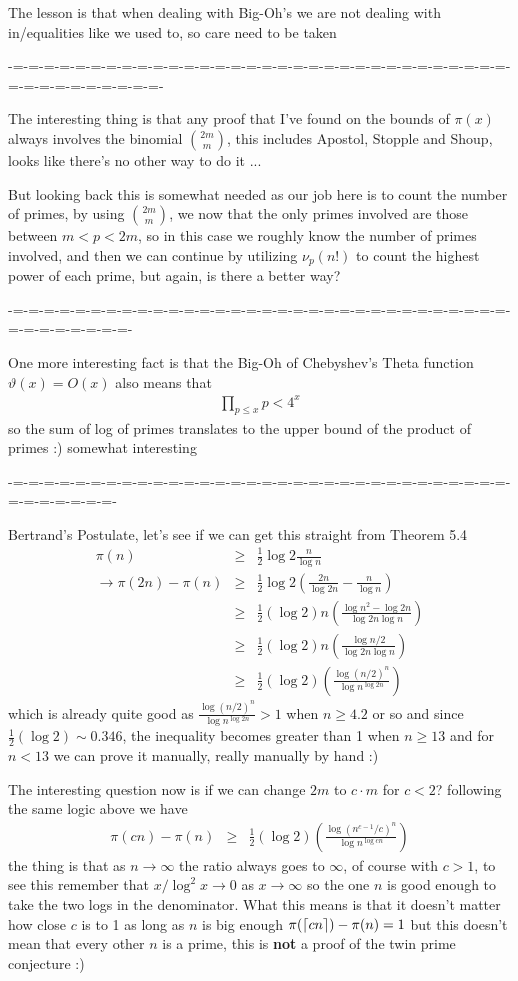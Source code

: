 \documentclass[aps,preprint,preprintnumbers,nofootinbib,showpacs,prd]{revtex4-1}
\newcommand{\nbea}{\begin{eqnarray*}}
\newcommand{\neea}{\end{eqnarray*}}
\DeclarePairedDelimiter{\ceil}{\lceil}{\rceil}
\begin{document}
The lesson is that when dealing with Big-Oh's we are not dealing with in/equalities like we used to, so care need to be taken

-=-=-=-=-=-=-=-=-=-=-=-=-=-=-=-=-=-=-=-=-=-=-=-=-=-=-=-=-=-=-=-=-=-=-=-=-=-=-=-=-=-=-

The interesting thing is that any proof that I've found on the bounds of $\pi(x)$ always involves the binomial $\binom{2m}{ m}$, this includes Apostol, Stopple and Shoup, looks like there's no other way to do it ...

But looking back this is somewhat needed as our job here is to count the number of primes, by using $\binom{2m}{m}$, we now that the only primes involved are those between $m < p < 2m$, so in this case we roughly know the number of primes involved, and then we can continue by utilizing $\nu_p(n!)$ to count the highest power of each prime, but again, is there a better way?

-=-=-=-=-=-=-=-=-=-=-=-=-=-=-=-=-=-=-=-=-=-=-=-=-=-=-=-=-=-=-=-=-=-=-=-=-=-=-=-=-

One more interesting fact is that the Big-Oh of Chebyshev's Theta function $\vartheta(x) = O(x)$ also means that 
%
\nbea
\prod_{p \le x} p < 4^x
\neea
%
so the sum of log of primes translates to the upper bound of the product of primes :) somewhat interesting

-=-=-=-=-=-=-=-=-=-=-=-=-=-=-=-=-=-=-=-=-=-=-=-=-=-=-=-=-=-=-=-=-=-=-=-=-=-=-=-

Bertrand's Postulate, let's see if we can get this straight from Theorem 5.4
%
\nbea
\pi(n) & \ge & \frac{1}{2}\log 2 \frac{n}{\log n} \\
\to \pi(2n) - \pi(n) & \ge & \frac{1}{2}\log 2 \left (\frac{2n}{\log 2n} - \frac{n}{\log n} \right ) \\
& \ge & \frac{1}{2}(\log 2) n \left (\frac{\log n^2 - \log 2n}{\log 2n \log n} \right ) \\
& \ge & \frac{1}{2}(\log 2) n \left (\frac{\log n/2}{\log 2n \log n} \right ) \\
& \ge & \frac{1}{2}(\log 2) \left (\frac{\log (n/2)^n}{ \log n^{\log 2n}} \right ) 
\neea
%
which is already quite good as $\frac{\log (n/2)^n}{ \log n^{\log 2n}} > 1$ when $n \ge 4.2$ or so and since $\frac{1}{2}(\log 2) \sim 0.346$, the inequality becomes greater than 1 when $n \ge 13$ and for $n < 13$ we can prove it manually, really manually by hand :)

The interesting question now is if we can change $2m$ to $c\cdot m$ for $c < 2$? following the same logic above we have
%
\nbea
\pi(cn) - \pi(n) & \ge & \frac{1}{2}(\log 2) \left (\frac{\log (n^{c-1}/c)^n}{ \log n^{\log cn}} \right ) 
\neea
%
the thing is that as $n\to \infty$ the ratio always goes to $\infty$, of course with $c > 1$, to see this remember that $x/\log^2 x \to 0$ as $x\to \infty$ so the one $n$ is good enough to take the two logs in the denominator. What this means is that it doesn't matter how close $c$ is to 1 as long as $n$ is big enough $\pi(\ceil{cn}) - \pi(n) = 1$ but this doesn't mean that every other $n$ is a prime, this is {\bf not} a proof of the twin prime conjecture :)
\end{document}
